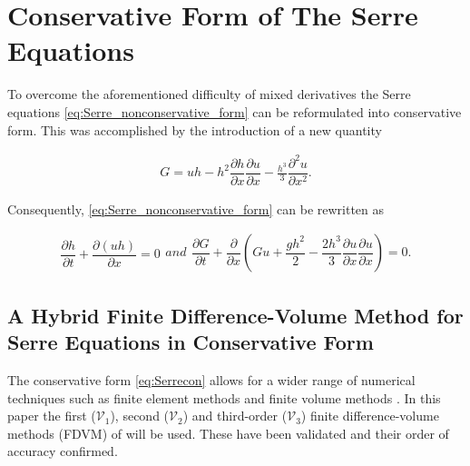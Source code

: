 \documentclass[SingleSpace,12pt,Proceedings]{Serre_ASCE}
\begin{document}
\section{Conservative Form of The Serre Equations}
To overcome the aforementioned difficulty of mixed derivatives the Serre equations \eqref{eq:Serre_nonconservative_form} can be reformulated into conservative form. This was accomplished by the introduction of a new quantity \cite{Hank-etal-2010-2034,Zoppou-2014}
\begin{linenomath*}
\begin{gather}
\label{eq:Gdefinition}
G = uh - h^2 \dfrac{\partial h}{\partial x} \dfrac{\partial u}{\partial x} - \frac{h^3}{3} \dfrac{\partial^2 u}{\partial x^2}.
\end{gather}
\end{linenomath*}
Consequently, \eqref{eq:Serre_nonconservative_form} can be rewritten as
\begin{linenomath*}
\begin{subequations}
\begin{gather}
\dfrac{\partial h}{\partial t} + \dfrac{\partial (uh)}{\partial x} = 0
\label{eq:Serrecon_continuity}
\end{gather}
and
\begin{gather}
\dfrac{\partial G}{\partial t} + \dfrac{\partial}{\partial x}\left(Gu + \dfrac{gh^2}{2} - \dfrac{2h^3}{3}\dfrac{\partial u}{\partial x}\dfrac{\partial u}{\partial x}\right) = 0.
\label{eq:Serrecon_momentum}
\end{gather}
\label{eq:Serrecon}
\end{subequations}
\end{linenomath*}

\subsection{A Hybrid Finite Difference-Volume Method for Serre Equations in Conservative Form}
\label{section:hybridmethod}
The conservative form \eqref{eq:Serrecon} allows for a wider range of numerical techniques such as finite element methods \cite{Guyenne-etal-2014-169} and finite volume methods \cite{Hank-etal-2010-2034,Zoppou-2014}. In this paper the first ($\mathcal{V}_1$), second ($\mathcal{V}_2$) and third-order ($\mathcal{V}_3$) finite difference-volume methods (FDVM) of  will be used. These have been validated and their order of accuracy confirmed.
\end{document}
